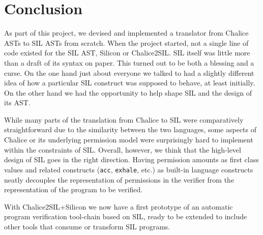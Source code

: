 \clearpage
\section{Conclusion}\label{sct:conclusion}
As part of this project, we devised and implemented a translator from Chalice ASTs to SIL ASTs from scratch.
When the project started, not a single line of code existed for the SIL AST, Silicon or Chalice2SIL.
SIL itself was little more than a draft of its syntax on paper.
This turned out to be both a blessing and a curse.
On the one hand just about everyone we talked to had a slightly different idea of how a particular SIL construct was supposed to behave, at least initially.
On the other hand we had the opportunity to help shape SIL and the design of its AST.

While many parts of the translation from Chalice to SIL were comparatively straightforward due to the similarity between the two languages, some aspects of Chalice or its underlying permission model were surprisingly hard to implement within the constraints of SIL.
Overall, however, we think that the high-level design of SIL goes in the right direction.
Having  permission amounts as first class values and related constructs (\lstinline[language=SIL]!acc!, \lstinline[language=SIL]!exhale!, etc.) as built-in language constructs neatly decouples the representation of permissions in the verifier from the representation of the program to be verified.

With Chalice2SIL+Silicon we now have a first prototype of an automatic program verification tool-chain based on SIL, ready to be extended to include other tools that consume or transform SIL programs.
